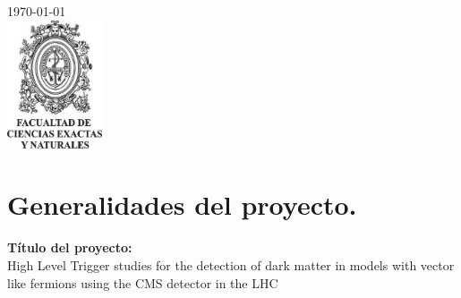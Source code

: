 \begin{titlepage}


{\large \today}\\[0.7cm] %


\includegraphics[width=2.8cm]{udea_fcen.jpg}\\[4cm] %
 

\vfill %

\end{titlepage}

\tableofcontents %

\cleardoublepage





\section{Generalidades del proyecto.}

\textbf{Título del proyecto:}\\
High Level Trigger studies for the detection of dark matter in models with vector like fermions using the CMS detector in the LHC
\\

